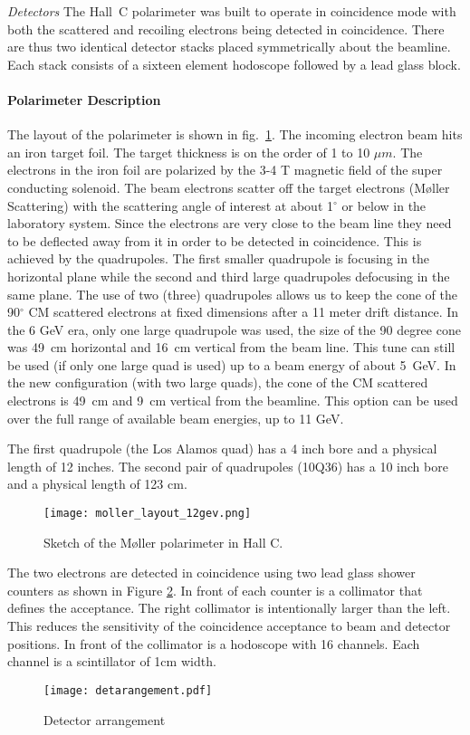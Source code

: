 {{\sl Detectors} The Hall~C polarimeter was built to operate in
coincidence mode with both the scattered and recoiling electrons being
detected in coincidence. There are thus two identical detector stacks
placed symmetrically about the beamline. Each stack consists of a
sixteen element hodoscope followed by a lead glass block.

\paragraph{Polarimeter Description}
The layout of the polarimeter is shown in fig.~\ref{fig:polsketch}.
The incoming electron beam hits an iron target foil. The target
thickness is on the order of 1 to 10 $\mu m$. The electrons in the
iron foil are polarized by the 3-4 T magnetic field of the super
conducting solenoid.  The beam electrons scatter off the target
electrons (M\o ller Scattering) with the scattering angle of interest
at about 1$^{\circ}$ or below in the laboratory system. Since the
electrons are very close to the beam line they need to be deflected
away from it in order to be detected in coincidence. This is achieved
by the quadrupoles. The first smaller quadrupole is focusing in the
horizontal plane while the second and third large quadrupoles
defocusing in the same plane. The use of two (three) quadrupoles
allows us to keep the cone of the 90$^{\circ}$ CM scattered electrons
at fixed dimensions after a 11 meter drift distance.  In the 6 GeV
era, only one large quadrupole was used, the size of the 90 degree
cone was 49~cm horizontal and 16~cm vertical from the beam line. This
tune can still be used (if only one large quad is used) up to a beam
energy of about 5~GeV. In the new configuration (with two large
quads), the cone of the CM scattered electrons is 49~cm and 9~cm
vertical from the beamline. This option can be used over the full
range of available beam energies, up to 11 GeV.

The first quadrupole (the Los Alamos quad) has a 4 inch bore and a
physical length of 12 inches. The second pair of quadrupoles (10Q36)
has a 10 inch bore and a physical length of 123 cm.
\begin{figure}[htp]
\begin{center}
    \texttt{[image: moller\_layout\_12gev.png]}
    \caption{Sketch of the M\o ller polarimeter in Hall C.\label{fig:polsketch}}
\end{center}
\end{figure}
The two electrons are detected in coincidence using two lead glass
shower counters as shown in Figure \ref{detarr}. In front of each
counter is a collimator that defines the acceptance. The right
collimator is intentionally larger than the left. This reduces the
sensitivity of the coincidence acceptance to beam and detector
positions. In front of the collimator is a hodoscope with 16
channels. Each channel is a scintillator of 1cm width.
\begin{figure}
\texttt{[image: detarangement.pdf]}
\begin{center}
\parbox{10cm}{
\caption{Detector arrangement}\label{detarr}}
\end{center}
\end{figure}

}
